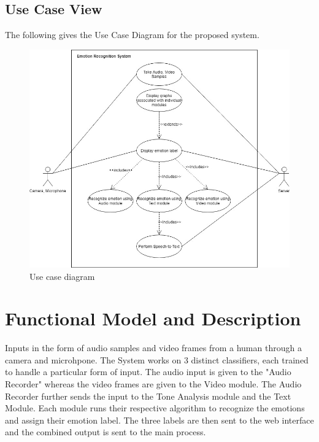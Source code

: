 \documentclass[oneside,a4paper,12pt]{report}
\begin{document}
\begin{normalsize}
\subsection{Use Case View}
The following gives the Use Case Diagram for the proposed system.
\begin{center}
	\begin{figure}[!htbp]
		\centering
		\includegraphics[width=\textwidth]{use_case_proj.jpg}
	  \caption{Use case diagram}
	  \label{fig:usecase}
	\end{figure}
\end{center}  
\newpage


\section{Functional Model and Description}
\hspace{15mm}Inputs in the form of audio samples and video frames from a human through a camera and microhpone. The System works on 3 distinct classifiers, each trained to handle a particular form of input. The audio input is given to the "Audio Recorder" whereas the video frames are given to the Video module. The Audio Recorder further sends the input to the Tone Analysis module and the Text Module. Each module runs their respective algorithm to recognize the emotions and assign their emotion label. The three labels are then sent to the web interface and the combined output is sent to the main process.

\end{normalsize}
\end{document}
